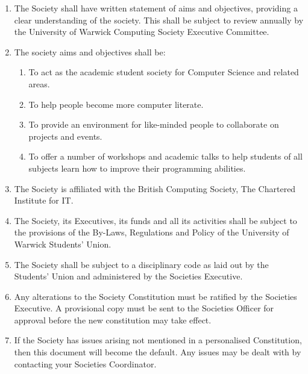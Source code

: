\documentclass{article}
\begin{document}
\begin{enumerate}
    \item The Society shall have written statement of aims and objectives, providing a clear understanding of the society. This shall be subject to review annually by the University of Warwick Computing Society Executive Committee.
    \item The society aims and objectives shall be:
    \begin{enumerate}
        \item To act as the academic student society for Computer Science and related areas.
        \item To help people become more computer literate.
        \item To provide an environment for like-minded people to collaborate on projects and events.
        \item To offer a number of workshops and academic talks to help students of all subjects learn how to improve their programming abilities.
    \end{enumerate}
    \item The Society is affiliated with the British Computing Society, The Chartered Institute for IT.
    \item The Society, its Executives, its funds and all its activities shall be subject to the provisions of the By-Laws, Regulations and Policy of the University of Warwick Students’ Union.
    \item The Society shall be subject to a disciplinary code as laid out by the Students’ Union and administered by the Societies Executive.
    \item Any alterations to the Society Constitution must be ratified by the Societies Executive. A provisional copy must be sent to the Societies Officer for approval before the new constitution may take effect.
    \item If the Society has issues arising not mentioned in a personalised Constitution, then this document will become the default. Any issues may be dealt with by contacting your Societies Coordinator.
\end{enumerate}
\end{document}
